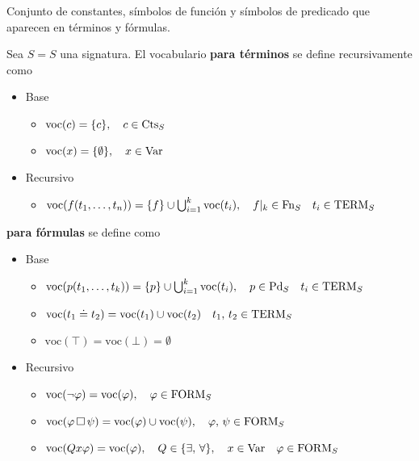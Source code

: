 \begin{definition}
Conjunto de constantes, símbolos de función y símbolos de predicado que aparecen en términos y fórmulas. 
\end{definition}

\begin{definition}
Sea $S= \si{S}$ una signatura. El vocabulario \textbf{para términos} se define recursivamente como
\begin{itemize}
	\item Base 
	\begin{itemize}
		\item $\mbox{voc}(c)=\{ c \}, \quad c \in \mbox{Cts}_{S}$ 
		\item $\mbox{voc}(x)=\{ \emptyset \}, \quad x \in \mbox{Var}$ 
	\end{itemize}
	\item Recursivo 
	\begin{itemize}
		\item $\mbox{voc}(f(t_1, \ldots, t_n))=\{ f \} \cup \bigcup_{i=1}^k \mbox{voc}(t_i), \quad f\vert_{k} \in \mbox{Fn}_{S} \quad t_i \in \mbox{TERM}_{S}$ 
	\end{itemize}
\end{itemize} 
\textbf{para fórmulas} se define como
\begin{itemize}
	\item Base
	\begin{itemize}
		\item $\mbox{voc}(p(t_1,\ldots, t_k))= \{p\} \cup \bigcup_{i=1}^k \mbox{voc}(t_i), \quad p \in \mbox{Pd}_{S} \quad t_i \in \mbox{TERM}_{S}$
		\item $\mbox{voc}(t_1 \doteq t_2)= \mbox{voc}(t_1) \cup \mbox{voc}(t_2) \quad t_1,\, t_2 \in \mbox{TERM}_{S}$
		\item $\mbox{voc}(\top)=\mbox{voc}(\bot)=\emptyset$
	\end{itemize}
	\item Recursivo
	\begin{itemize}
		\item $\mbox{voc}(\neg \varphi)=\mbox{voc}(\varphi), \quad \varphi \in \mbox{FORM}_{S}$
		\item $\mbox{voc}(\varphi \, \Box \, \psi) = \mbox{voc}(\varphi) \cup \mbox{voc}(\psi), \quad \varphi, \, \psi \in \mbox{FORM}_{S}$
		\item $\mbox{voc}(Qx\varphi)=\mbox{voc}(\varphi), \quad Q \in \{\exists, \, \forall\}, \quad x \in \mbox{Var} \quad \varphi \in \mbox{FORM}_{S}$
	\end{itemize}
\end{itemize}
\end{definition}

